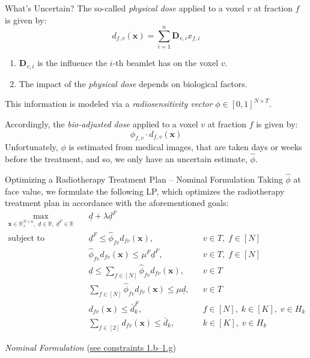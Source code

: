 \documentclass[11pt]{beamer}
\begin{document}
\begin{frame}{What's Uncertain?}
    The so-called \textit{physical dose} applied to a voxel $v$ at fraction $f$ is given by:
    \[
    d_{f,v}(\mathbf{x}) = \sum_{i=1}^n \mathbf{D}_{v,i} x_{f,i}
    \]
    \begin{enumerate}
        \item $\mathbf{D}_{v,i}$ is the influence the $i$-th beamlet has on the voxel $v$.
        \item The impact of the \textit{physical dose} depends on biological factors.
    \end{enumerate}

    This information is modeled via a \textit{radiosensitivity vector} $\phi \in [0,1]^{N\times T}$.

    Accordingly, the \textit{bio-adjusted dose} applied to a voxel $v$ at fraction $f$ is given by:
    \[
    \phi_{f,v} \cdot d_{f,v}(\mathbf{x})
    \]
    Unfortunately, $\phi$ is estimated from medical images, that are taken days or weeks before the treatment, and so, we only have an uncertain estimate, $\hat{\phi}$.
\end{frame}

\begin{frame}{Optimizing a Radiotherapy Treatment Plan – Nominal Formulation}
    Taking $\hat{\phi}$ at face value, we formulate the following LP, which optimizes the radiotherapy treatment plan in accordance with the aforementioned goals:
    \small{
    \begin{align}
        \max_{\mathbf{x} \in \mathbb{R}_+^{N \times n},\; \underline{d} \in \mathbb{R},\; \underline{d}^F \in \mathbb{R}} \quad & \underline{d} + \lambda \underline{d}^F \tag{1.a} \\
        \text{subject to} \quad 
        & \underline{d}^F \le \hat{\phi}_{fv} d_{fv}(\mathbf{x}), && v \in T,\; f \in [N] \tag{1.b} \label{1.b} \\
        & \hat{\phi}_{fv} d_{fv}(\mathbf{x}) \le \mu^F \underline{d}^F, && v \in T,\; f \in [N] \tag{1.c} \label{1.c} \\
        & \underline{d} \le \sum_{f \in [N]} \hat{\phi}_{fv} d_{fv}(\mathbf{x}), && v \in T \tag{1.d} \label{1.d} \\
        & \sum_{f \in [N]} \hat{\phi}_{fv} d_{fv}(\mathbf{x}) \le \mu \underline{d}, && v \in T \tag{1.e} \label{1.e} \\
        & d_{fv}(\mathbf{x}) \le \bar{d}_k^F, && f \in [N],\; k \in [K],\; v \in H_k \tag{1.f} \label{1.f} \\
        & \sum_{f \in [2]} d_{fv}(\mathbf{x}) \le \bar{d}_k, && k \in [K],\; v \in H_k \tag{1.g} \label{1.g}
    \end{align}}
    \vspace{0.5em}
    \begin{center}
    \textit{Nominal Formulation} \quad (\hyperref[1.b]{see constraints 1.b–1.g})
    \end{center}
    \end{frame}
\end{document}
